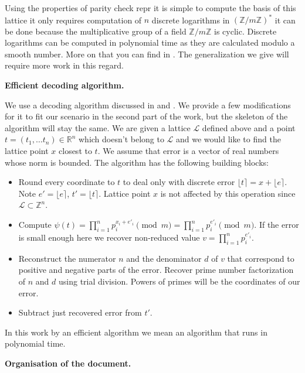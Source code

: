\documentclass[12pt]{article}
\newcommand{\ZZ}{\mathbb{Z}}
\newcommand{\LL}{\mathcal{L}}
\begin{document}
Using the properties of parity check repr it is simple to compute the basis of this lattice it only requires computation of $n$ discrete logarithms in $(\ZZ/m\ZZ)^*$ it can be done because the multiplicative group of a field $\ZZ/m\ZZ$ is cyclic. Discrete logarithms can be computed in polynomial time as they are calculated modulo a smooth number. More on that you can find in \cite{[DP19]}. The generalization we give will require more work in this regard.




\textbf{Efficient decoding algorithm.}

We use a decoding algorithm discussed in \cite{[DP19]} and \cite{[LLXY17]}. We provide a few modifications for it to fit our scenario in the second part of the work, but the skeleton of the algorithm will stay the same. We are given a lattice $\LL$ defined above and a point $t = (t_1, \dots t_n) \in \mathbb{R}^{n}$ which doesn't belong to $\LL$ and we would like to find the lattice point $x$ closest to $t$. We assume that error is a vector of real numbers whose norm is bounded. The algorithm has the following building blocks:

\begin{itemize}
    \item Round every coordinate to $t$ to deal only with discrete error $\lfloor t \rceil = x + \lfloor e \rceil$. Note $e' = \lfloor e \rceil$, $t' = \lfloor t \rceil$. Lattice point $x$ is not affected by this operation since $\LL \subset \ZZ^{n}$.
    \item Compute $\psi(t) = \prod_{i=1}^{n}p_{i}^{x_{i} + e'_i} \pmod{m} = \prod_{i=1}^{n}p_{i}^{e'_i} \pmod{m}$. If the error is small enough here we recover non-reduced value $v = \prod_{i=1}^{n}p_{i}^{e'_i}$.
    \item Reconstruct the numerator $n$ and the denominator $d$ of $v$ that correspond to positive and negative parts of the error. Recover prime number factorization of $n$ and $d$ using trial division. Powers of primes will be the coordinates of our error.
    \item Subtract just recovered error from $t'$.
\end{itemize}
In this work by an efficient algorithm we mean an algorithm that runs in polynomial time.

\textbf{Organisation of the document.}
\end{document}
